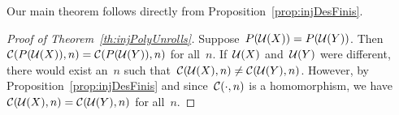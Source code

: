 	        Our main theorem follows directly from Proposition~\ref{prop:injDesFinis}.
	
	   \begin{proof}[Proof of Theorem~\ref{th:injPolyUnrolls}]
	        Suppose~$P(\mathcal{U}(X)) = P(\mathcal{U}(Y))$. Then~$\mathcal{C}(P(\mathcal{U}(X)),n) = \mathcal{C}(P(\mathcal{U}(Y)),n)$ for all~$n$. If~$\mathcal{U}(X)$ and~$\mathcal{U}(Y)$ were different, there would exist an~$n$ such that~$\mathcal{C}(\mathcal{U}(X),n) \ne \mathcal{C}(\mathcal{U}(Y),n)$. However, by Proposition~\ref{prop:injDesFinis} and since~$\mathcal{C}(\cdot,n)$ is a homomorphism, we have~$\mathcal{C}(\mathcal{U}(X),n) = \mathcal{C}(\mathcal{U}(Y),n)$ for all~$n$.
	    \end{proof}
	        
		
